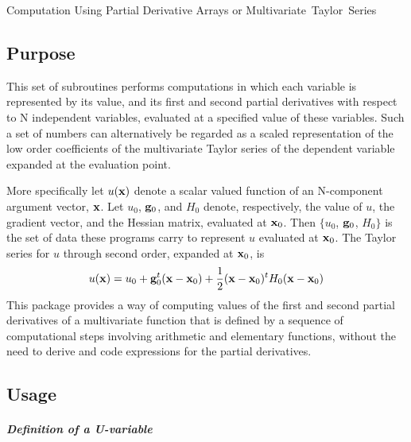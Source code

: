 \documentclass[twoside]{MATH77}
\begin{document}
 Computation Using Partial Derivative Arrays or
\hbox{Multivariate Taylor Series}


\subsection{Purpose}

This set of subroutines performs computations in which each variable is
represented by its value, and its first and second partial derivatives with
respect to N independent variables, evaluated at a specified value of these
variables. Such a set of numbers can alternatively be regarded as a scaled
representation of the low order coefficients of the multivariate Taylor
series of the dependent variable expanded at the evaluation point.

More specifically let $u({\bf x})$ denote a scalar valued function of an
N-component argument vector, ${\bf x}$. Let $u_0$, ${\bf g}_0$, and $H_0$ denote,
respectively, the value of $u$, the gradient vector, and the Hessian matrix,
evaluated at ${\bf x}_0$. Then $\{u_0$, ${\bf g}_0$, $H_0\}$ is the set of data these
programs carry to represent $u$ evaluated at ${\bf x}_0$. The Taylor series for $u$
through second order, expanded at ${\bf x}_0$, is
\begin{equation*}
u({\bf x}) = u_0 + {\bf g}^t_0({\bf x}-{\bf x}_0) + \frac{1}{2}({\bf
x}-{\bf x}_0)^t H_0({\bf x}-{\bf x}_0)
\end{equation*}
This package provides a way of computing values of the first and second
partial derivatives of a multivariate function that is defined by a sequence
of computational steps involving arithmetic and elementary functions,
without the need to derive and code expressions for the partial derivatives.

\subsection{Usage}

\subparagraph{Definition of a U-variable}
\end{document}
